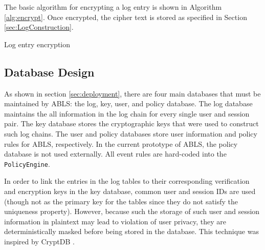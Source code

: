 \documentclass{sig-alternate}
\begin{document}
The basic algorithm for encrypting a log entry is shown in Algorithm \ref{alg:encrypt}. Once encrypted, the cipher text
is stored as specified in Section \ref{sec:LogConstruction}.

\begin{algorithm}[ht!] %
\caption{Log entry encryption} \label{alg:encrypt}
\begin{algorithmic}[1]

\ENDIF
{}
\end{algorithmic}
\end{algorithm}

\subsection{Database Design}
\label{sec:databaseDesign}
As shown in section \ref{sec:deployment}, there are four main databases that must be maintained by ABLS:
the log, key, user, and policy database. The log database maintains the all information in the log chain for every 
single user and session pair. The key database stores the cryptographic keys that were used to construct
such log chains. The user and policy databases store user information and policy rules for ABLS, respectively. 
In the current prototype of ABLS, the policy database is not used externally. All event rules are hard-coded into
the {\tt PolicyEngine}. 

In order to link the entries in the log tables to their corresponding verification and encryption keys in the key database,
common user and session IDs are used (though not as the primary key for the tables since they do not satisfy
the uniqueness property). However, because such the storage of such user and session information in plaintext
may lead to violation of user privacy, they are deterministically masked before being stored in the database. This technique
was inspired by CryptDB \cite{Popa2012-CryptDB}.
\end{document}
